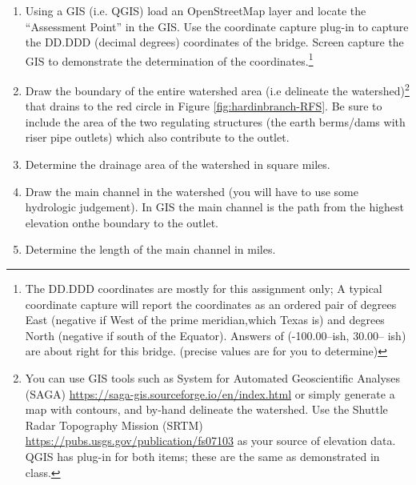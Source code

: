 \documentclass[12pt]{article}
\begin{document}
\begin{enumerate}
\item Using a GIS (i.e. QGIS) load an OpenStreetMap layer and locate the ``Assessment Point'' in the GIS.  Use the coordinate capture plug-in to capture the DD.DDD (decimal degrees) coordinates of the bridge.  Screen capture the GIS to demonstrate the determination of the coordinates.\footnote{The DD.DDD coordinates are mostly for this assignment only; A typical coordinate capture will report the coordinates as an ordered pair of degrees East (negative if West of the prime meridian,which Texas is) and degrees North (negative if south of the Equator).  Answers of (-100.00--ish, 30.00-- ish) are about right for this bridge. (precise values are for you to determine)}

\item Draw the boundary of the entire watershed area (i.e delineate the watershed)\footnote{You can use GIS tools such as System for Automated Geoscientific Analyses (SAGA) \url{https://saga-gis.sourceforge.io/en/index.html} or simply generate a map with contours, and by-hand delineate the watershed.  Use the Shuttle Radar Topography Mission (SRTM) \url{https://pubs.usgs.gov/publication/fs07103} as your source of elevation data.  QGIS has plug-in for both items; these are the same as demonstrated in class.} that drains to the red circle in Figure \ref{fig:hardinbranch-RFS}. Be sure to include the area of the two regulating structures (the earth berms/dams with riser pipe outlets) which also contribute to the outlet.

\item Determine the drainage area of the watershed in square miles.

\item Draw the main channel in the watershed (you will have to use some hydrologic judgement). In GIS the main channel is the path from the highest elevation onthe boundary to the outlet.
    
\item Determine the length of the main channel in miles.

\end{enumerate}
\end{document}
